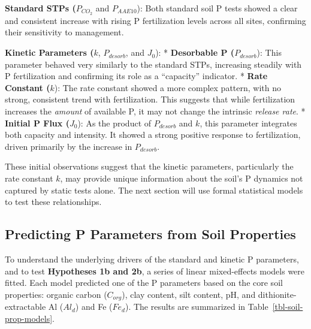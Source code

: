 \documentclass[
  a4paper,
]{article}
\begin{document}
\textbf{Standard STPs (}\(P_{CO_2}\) and \(P_{AAE10}\)): Both standard
soil P tests showed a clear and consistent increase with rising P
fertilization levels across all sites, confirming their sensitivity to
management.

\textbf{Kinetic Parameters (}\(k\), \(P_{desorb}\), and \(J_0\)): *
\textbf{Desorbable P (}\(P_{desorb}\)): This parameter behaved very
similarly to the standard STPs, increasing steadily with P fertilization
and confirming its role as a ``capacity'' indicator. * \textbf{Rate
Constant (}\(k\)): The rate constant showed a more complex pattern, with
no strong, consistent trend with fertilization. This suggests that while
fertilization increases the \emph{amount} of available P, it may not
change the intrinsic \emph{release rate}. * \textbf{Initial P Flux
(}\(J_0\)): As the product of \(P_{desorb}\) and \(k\), this parameter
integrates both capacity and intensity. It showed a strong positive
response to fertilization, driven primarily by the increase in
\(P_{desorb}\).

These initial observations suggest that the kinetic parameters,
particularly the rate constant \(k\), may provide unique information
about the soil's P dynamics not captured by static tests alone. The next
section will use formal statistical models to test these relationships.

\subsection{Predicting P Parameters from Soil
Properties}\label{sec-p-params-soil-props}

To understand the underlying drivers of the standard and kinetic P
parameters, and to test \textbf{Hypotheses 1b and 2b}, a series of
linear mixed-effects models were fitted. Each model predicted one of the
P parameters based on the core soil properties: organic carbon
(\(C_{org}\)), clay content, silt content, pH, and
dithionite-extractable Al (\(Al_d\)) and Fe (\(Fe_d\)). The results are
summarized in Table~\ref{tbl-soil-prop-models}.
\end{document}
